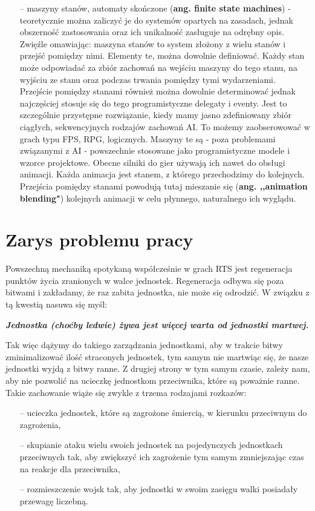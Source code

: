 \documentclass[12pt]{report}
\begin{document}
\begin{itemize}
\item[--] maszyny stanów, automaty skończone (\textbf{ang. finite state machines}) - teoretycznie można zaliczyć je do systemów opartych na zasadach, jednak obszerność zastosowania oraz ich unikalność zasługuje na odrębny opis. Zwięźle omawiając: maszyna stanów to system złożony z wielu stanów i przejść pomiędzy nimi. Elementy te, można dowolnie definiować. Każdy stan może odpowiadać za zbiór zachowań na wejściu maszyny do tego stanu, na wyjściu ze stanu oraz podczas trwania pomiędzy tymi wydarzeniami. Przejście pomiędzy stanami również można dowolnie determinować jednak najczęściej stosuje się do tego programistyczne delegaty i eventy. Jest to szczególnie przystępne rozwiązanie, kiedy mamy jasno zdefiniowany zbiór ciągłych, sekwencyjnych rodzajów zachowań AI. To możemy zaobserowować w grach typu FPS, RPG, logicznych. Maszyny te są - poza problemami związanymi z AI - powszechnie stosowane jako programistyczne modele i wzorce projektowe. Obecne silniki do gier używają ich nawet do obsługi animacji. Każda animacja jest stanem, z którego przechodzimy do kolejnych.  Przejścia pomiędzy stanami powodują tutaj mieszanie się (\textbf{ang. ,,animation blending"}) kolejnych animacji w celu płynnego, naturalnego ich wyglądu.
\end{itemize}







\section {Zarys problemu pracy}
Powszechną mechaniką spotykaną współcześnie w grach RTS jest regeneracja punktów życia zranionych w walce jednostek. Regeneracja odbywa się poza bitwami i zakładamy, że raz zabita jednostka, nie może się odrodzić. W związku z tą kwestią nasuwa się myśl:

\noindent\textbf{\textit{Jednostka (choćby ledwie) żywa jest więcej warta od jednostki martwej.}}

Tak więc dążymy do takiego zarządzania jednostkami, aby w trakcie bitwy zminimalizować ilość straconych jednostek, tym samym nie martwiąc się, że nasze jednostki wyjdą z bitwy ranne. Z drugiej strony w tym samym czasie, zależy nam, aby nie pozwolić na ucieczkę jednostkom przeciwnika, które są poważnie ranne. Takie zachowanie wiąże się zwykle z trzema rodzajami rozkazów:
\begin{itemize}
\item[--] ucieczka jednostek, które są zagrożone śmiercią, w kierunku przeciwnym do zagrożenia,
\item[--] skupianie ataku wielu swoich jednostek na pojedynczych jednostkach przeciwnych tak, aby zwiększyć ich zagrożenie tym samym zmniejszając czas na reakcje dla przeciwnika,
\item[--] rozmieszczenie wojsk tak, aby jednostki w swoim zasięgu walki posiadały przewagę liczebną.
\end{itemize}
\end{document}
